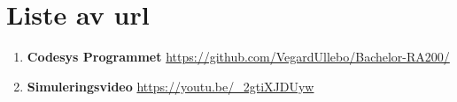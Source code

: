 
\chapter*{Liste av url}
\thispagestyle{fancy}

\begin{enumerate}
    \item \textbf{Codesys Programmet} \url{https://github.com/VegardUllebo/Bachelor-RA200/}
    \item \textbf{Simuleringsvideo}   \url{https://youtu.be/_2gtiXJDUyw}
\end{enumerate}

